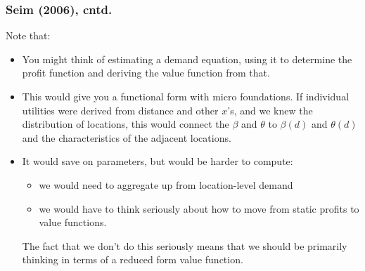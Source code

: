\begin{frame}%

\frametitle{Seim (2006), cntd.}

Note that:

\begin{itemize}
\item You might think of estimating a demand equation, using it to determine
the profit function and deriving the value function from that.

\item This would give you a functional form with micro foundations. If
individual utilities were derived from distance and other $x$'s, and we knew
the distribution of locations, this would connect the $\beta $ and $\theta $
to $\beta (d)$ and $\theta (d)$ and the characteristics of the adjacent
locations.

\item It would save on parameters, but would be harder to compute:

\begin{itemize}
\item we would need to aggregate up from location-level demand

\item we would have to think seriously about how to move from static profits
to value functions.
\end{itemize}

The fact that we don't do this seriously means that we should be primarily
thinking in terms of a reduced form value function.
\end{itemize}

\end{frame}%

